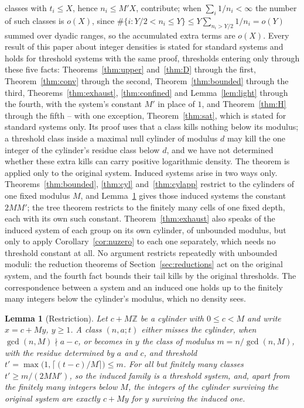 \documentclass[11pt]{article}
\theoremstyle{plain}
\newtheorem{lemma}[theorem]{Lemma}
\theoremstyle{definition}
\begin{document}
classes with $t_i\le X$, hence $n_i\le M'X$, contribute; when
$\sum_i1/n_i<\infty$ the number of such classes is $o(X)$, since
$\#\{i:Y/2<n_i\le Y\}\le Y\sum_{n_i>Y/2}1/n_i=o(Y)$ summed over
dyadic ranges, so the accumulated extra terms are $o(X)$.  Every
result of this paper about integer densities is stated for
standard systems and holds for threshold systems with the same
proof, thresholds entering
only through these five facts: Theorems~\ref{thm:upper}
and~\ref{thm:D} through the first, Theorem~\ref{thm:conv} through the second,
Theorem~\ref{thm:bounded} through the third,
Theorems~\ref{thm:exhaust}, \ref{thm:confined} and
Lemma~\ref{lem:light} through the fourth, with the system's
constant $M'$ in place of $1$, and Theorem~\ref{thm:H} through
the fifth -- with one exception, Theorem~\ref{thm:sat}, which is
stated for standard systems only.  Its proof uses that a class
kills nothing below its modulus; a threshold class inside a
maximal null cylinder of modulus $d$ may kill the one integer of
the cylinder's residue class below $d$, and we have not
determined whether these extra kills can carry positive
logarithmic density.  The theorem is applied only to the original
system.  Induced systems arise in two
ways only.  Theorems~\ref{thm:bounded}, \ref{thm:cyl}
and~\ref{thm:cylapp} restrict to the cylinders of one fixed
modulus $M$, and Lemma~\ref{lem:restrict} gives those induced
systems the constant $2MM'$; the tree theorem restricts to the
finitely many cells of one fixed depth, each with its own such
constant.  Theorem~\ref{thm:exhaust} also speaks of the induced
system of each group on its own cylinder, of unbounded modulus,
but only to apply Corollary~\ref{cor:nuzero} to each one
separately, which needs no threshold constant at all.  No
argument restricts repeatedly with unbounded moduli: the
reduction theorems of Section~\ref{sec:reductions} act on the
original system, and the fourth fact bounds their tail kills by
the original thresholds.
The correspondence between a system and an induced one holds up
to the finitely many integers below the cylinder's modulus,
which no density sees.

\begin{lemma}[Restriction]\label{lem:restrict}
Let $c+M\mathbb{Z}$ be a cylinder with $0\le c<M$ and write
$x=c+My$, $y\ge1$.  A class
$(n,a;t)$ either misses the cylinder, when
$\gcd(n,M)\nmid a-c$, or becomes in $y$ the class of modulus
$m=n/\gcd(n,M)$, with the residue determined by $a$ and $c$, and
threshold $t'=\max\bigl(1,\lceil(t-c)/M\rceil\bigr)\le m$.  For
all but finitely many classes $t'\ge m/(2MM')$, so the induced
family is a threshold system, and, apart from the finitely
many integers below $M$, the integers of the cylinder surviving
the original system are exactly $c+My$ for $y$ surviving the
induced one.
\end{lemma}
\end{document}
